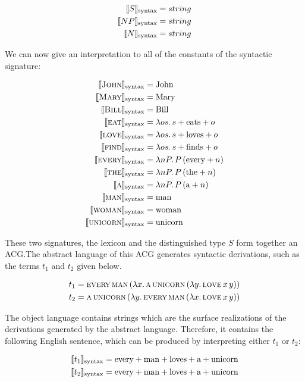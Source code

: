 \begin{align*}
  \llbracket S \rrbracket_{\text{syntax}} &= string \\
  \llbracket NP \rrbracket_{\text{syntax}} &= string \\
  \llbracket N \rrbracket_{\text{syntax}} &= string
\end{align*}

We can now give an interpretation to all of the constants of the syntactic
signature:

\begin{align*}
  \llbracket \textsc{John} \rrbracket_{\text{syntax}} &= \text{John} \\
  \llbracket \textsc{Mary} \rrbracket_{\text{syntax}} &= \text{Mary} \\
  \llbracket \textsc{Bill} \rrbracket_{\text{syntax}} &= \text{Bill} \\
  \llbracket \textsc{eat} \rrbracket_{\text{syntax}} &= \lambda o s.\, s + \text{eats} + o \\
  \llbracket \textsc{love} \rrbracket_{\text{syntax}} &= \lambda o s.\, s + \text{loves} + o \\
  \llbracket \textsc{find} \rrbracket_{\text{syntax}} &= \lambda o s.\, s + \text{finds} + o \\
  \llbracket \textsc{every} \rrbracket_{\text{syntax}} &= \lambda n P.\, P\,(\text{every} + n) \\
  \llbracket \textsc{the} \rrbracket_{\text{syntax}} &= \lambda n P.\, P\,(\text{the} + n) \\
  \llbracket \textsc{a} \rrbracket_{\text{syntax}} &= \lambda n P.\, P\,(\text{a} + n) \\
  \llbracket \textsc{man} \rrbracket_{\text{syntax}} &= \text{man} \\
  \llbracket \textsc{woman} \rrbracket_{\text{syntax}} &= \text{woman} \\
  \llbracket \textsc{unicorn} \rrbracket_{\text{syntax}} &= \text{unicorn}
\end{align*}

These two signatures, the lexicon and the distinguished type $S$ form
together an ACG.\@ The abstract language of this ACG generates syntactic
derivations, such as the terms $t_1$ and $t_2$ given below.

\begin{align*}
  &t_1 = \textsc{every}\,\textsc{man}\,(\lambda x.\, \textsc{a}\,\textsc{unicorn}\,(\lambda y.\, \textsc{love}\,x\,y)) \\
  &t_2 = \textsc{a}\,\textsc{unicorn}\,(\lambda y.\, \textsc{every}\,\textsc{man}\,(\lambda x.\, \textsc{love}\,x\,y))
\end{align*}

The object language contains strings which are the surface realizations of
the derivations generated by the abstract language. Therefore, it contains
the following English sentence, which can be produced by interpreting
either $t_1$ or $t_2$:

\begin{align*}
  &\llbracket t_1 \rrbracket_{\text{syntax}} = \text{every} + \text{man} + \text{loves} + \text{a} + \text{unicorn} \\
  &\llbracket t_2 \rrbracket_{\text{syntax}} = \text{every} + \text{man} + \text{loves} + \text{a} + \text{unicorn}
\end{align*}

